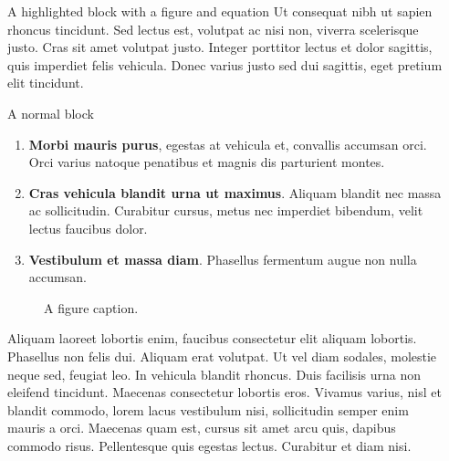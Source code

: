 \documentclass[final]{beamer}
\newlength{\sepwidth}
\newlength{\colwidth}
\newcommand{\separatorcolumn}{\begin{column}{\sepwidth}\end{column}}
\begin{document}
\begin{frame}[t]
\begin{columns}[t]
\begin{column}{\colwidth}
\begin{alertblock}{A highlighted block with a figure and equation}
Ut consequat nibh ut sapien rhoncus tincidunt. Sed lectus est, volutpat ac nisi non, viverra scelerisque justo. Cras sit amet volutpat justo. Integer porttitor lectus et dolor sagittis, quis imperdiet felis vehicula. Donec varius justo sed dui sagittis, eget pretium elit tincidunt. 
  \end{alertblock}
  \begin{block}{A normal block}


    \begin{enumerate}
      \item \textbf{Morbi mauris purus}, egestas at vehicula et, convallis
        accumsan orci. Orci varius natoque penatibus et magnis dis parturient
        montes.
      \item \textbf{Cras vehicula blandit urna ut maximus}. Aliquam blandit nec
        massa ac sollicitudin. Curabitur cursus, metus nec imperdiet bibendum,
        velit lectus faucibus dolor.
      \item \textbf{Vestibulum et massa diam}. Phasellus fermentum augue non
        nulla accumsan.
    \end{enumerate}


   \begin{figure}
      \centering
      \caption{A figure caption.}
    \end{figure}

Aliquam laoreet lobortis enim, faucibus consectetur elit aliquam lobortis. Phasellus non felis dui. Aliquam erat volutpat. Ut vel diam sodales, molestie neque sed, feugiat leo. In vehicula blandit rhoncus. Duis facilisis urna non eleifend tincidunt. Maecenas consectetur lobortis eros. Vivamus varius, nisl et blandit commodo, lorem lacus vestibulum nisi, sollicitudin semper enim mauris a orci. Maecenas quam est, cursus sit amet arcu quis, dapibus commodo risus. Pellentesque quis egestas lectus. Curabitur et diam nisi. 


  \end{block}


\vspace{0pt}

\end{column}

\separatorcolumn
\end{columns}
\end{frame}
\end{document}
